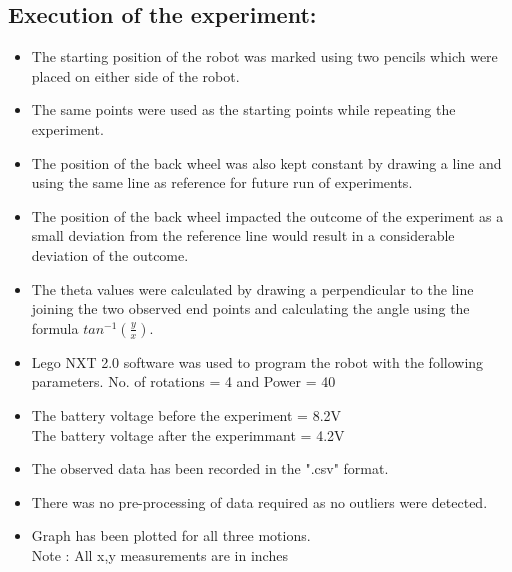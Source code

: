 \documentclass[11pt,a4paper,titlepage]{article}
\begin{document}
\subsection{Execution of the experiment:}
\begin{itemize}
\item The starting position of the robot was marked using two pencils which were placed on either side of the robot.
\item The same points were used as the starting points while repeating the experiment.
\item The position of the back wheel was also kept constant by drawing a line and using the same line as reference for future run of experiments.
\item The position of the back wheel impacted the outcome of the experiment as a small deviation from the reference line would result in a considerable deviation of the outcome.
\item The theta values were calculated by drawing a perpendicular to the line joining the two observed end points and calculating the angle using the formula $tan^{-1}(\frac{y}{x})$.
\item Lego NXT 2.0 software was used to program the robot with the following parameters.
No. of rotations = 4 and 
Power = 40
\item {\color{blue}The battery voltage before the experiment = 8.2V \\ The battery voltage after the experimmant = 4.2V}
\item The observed data has been recorded in the ".csv" format.
\item There was no pre-processing of data required as no outliers were detected.

\item Graph has been plotted for all three motions. \\
Note : All x,y measurements are in inches

\end{itemize}
\end{document}
